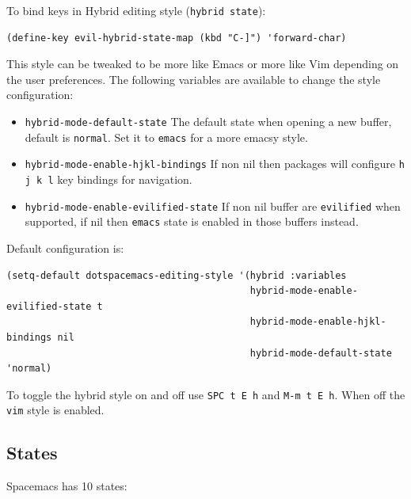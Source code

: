 \documentclass[11pt]{article}
\begin{document}
To bind keys in Hybrid editing style (\texttt{hybrid state}):

\begin{verbatim}
(define-key evil-hybrid-state-map (kbd "C-]") 'forward-char)
\end{verbatim}

This style can be tweaked to be more like Emacs or more like Vim depending
on the user preferences. The following variables are available to change the
style configuration:

\begin{itemize}
\item \texttt{hybrid-mode-default-state} The default state when opening a new buffer,
default is \texttt{normal}. Set it to \texttt{emacs} for a more emacsy style.
\item \texttt{hybrid-mode-enable-hjkl-bindings} If non nil then packages will configure
\texttt{h j k l} key bindings for navigation.
\item \texttt{hybrid-mode-enable-evilified-state} If non nil buffer are \texttt{evilified} when
supported, if nil then \texttt{emacs} state is enabled in those buffers instead.
\end{itemize}

Default configuration is:

\begin{verbatim}
(setq-default dotspacemacs-editing-style '(hybrid :variables
                                           hybrid-mode-enable-evilified-state t
                                           hybrid-mode-enable-hjkl-bindings nil
                                           hybrid-mode-default-state 'normal)
\end{verbatim}

To toggle the hybrid style on and off use \texttt{SPC t E h} and \texttt{M-m t E h}. When
off the \texttt{vim} style is enabled.

\subsection{States}
\label{sec:orgc8521de}
Spacemacs has 10 states:
\end{document}
